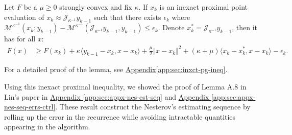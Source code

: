 \documentclass[12pt]{article}
\begin{document}
    \begin{lemma}\label{lemma:lin-ixct-prox-ineq}
        Let $F$ be a $\mu\ge 0$ strongly convex and fix $\kappa$. 
        If $x_k$ is an inexact proximal point evaluation of $x_k \approx \mathcal J_{\kappa^{-1}} y_{k - 1}$ such that there exists $\epsilon_k$ where $\mathcal M^{\kappa^{-1}}(x_k; y_{k - 1}) - \mathcal M^{\kappa^{-1}}(\mathcal J_{\kappa^{-1}} y_{k - 1}, y_{k - 1}) \le \epsilon_k$. 
        Denote $x_k^* = \mathcal J_{\kappa^{-1}} y_{k - 1}$, then it has for all $x$: 
        \begin{align*}
            F(x) &\ge 
            F(x_k) + \kappa \langle y_{k - 1} - x_k, x - x_k\rangle
            + \frac{\mu}{2}\Vert x - x_k\Vert^2 
            + (\kappa + \mu)\langle  x_k - x_k^*, x - x_k\rangle 
            - \epsilon_k.
        \end{align*}
    \end{lemma}
    \begin{remark}
        For a detailed proof of the lemma, see 
        \hyperref[app:sec:inxct-pg-ineq]{Appendix\ref*{app:sec:inxct-pg-ineq}}. 

    \end{remark}
    Using this inexact proximal inequality, we showed the proof of Lemma A.8 in Lin's paper \cite{lin_universal_2015} in 
    \hyperref[app:sec:appx-nes-est-seq]{Appendix \ref*{app:sec:appx-nes-est-seq}}
    and 
    \hyperref[app:sec:appx-nes-seq-errs-ctrl]{Appendix \ref*{app:sec:appx-nes-seq-errs-ctrl}}. 
    These result construct the Nesterov's estimating sequence by rolling up the error in the recurrence while avoiding intractable quantities appearing in the algorithm. 
    


    
\end{document}
